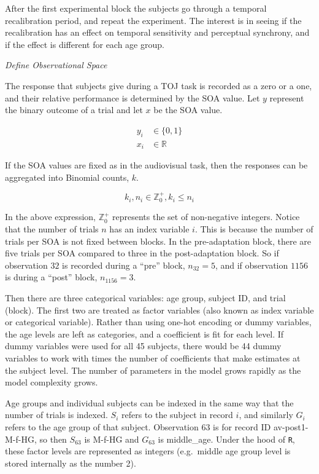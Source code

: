 \documentclass[11pt, oneside, openany]{scrbook}
\begin{document}
After the first experimental block the subjects go through a temporal recalibration period, and repeat the experiment. The interest is in seeing if the recalibration has an effect on temporal sensitivity and perceptual synchrony, and if the effect is different for each age group.

\emph{Define Observational Space}

The response that subjects give during a TOJ task is recorded as a zero or a one, and their relative performance is determined by the SOA value. Let \(y\) represent the binary outcome of a trial and let \(x\) be the SOA value.


\begin{align*}
y_i &\in \lbrace 0, 1\rbrace \\
x_i &\in \mathbb{R}
\end{align*}

If the SOA values are fixed as in the audiovisual task, then the responses can be aggregated into Binomial counts, \(k\).

\[k_i, n_i \in \mathbb{Z}_0^+, k_i \le n_i\]

In the above expression, \(\mathbb{Z}_0^+\) represents the set of non-negative integers. Notice that the number of trials \(n\) has an index variable \(i\). This is because the number of trials per SOA is not fixed between blocks. In the pre-adaptation block, there are five trials per SOA compared to three in the post-adaptation block. So if observation \(32\) is recorded during a ``pre'' block, \(n_{32} = 5\), and if observation \(1156\) is during a ``post'' block, \(n_{1156} = 3\).

Then there are three categorical variables: age group, subject ID, and trial (block). The first two are treated as factor variables (also known as index variable or categorical variable). Rather than using one-hot encoding or dummy variables, the age levels are left as categories, and a coefficient is fit for each level. If dummy variables were used for all 45 subjects, there would be 44 dummy variables to work with times the number of coefficients that make estimates at the subject level. The number of parameters in the model grows rapidly as the model complexity grows.

Age groups and individual subjects can be indexed in the same way that the number of trials is indexed. \(S_i\) refers to the subject in record \(i\), and similarly \(G_i\) refers to the age group of that subject. Observation \(63\) is for record ID av-post1-M-f-HG, so then \(S_{63}\) is M-f-HG and \(G_{63}\) is middle\_age. Under the hood of \texttt{R}, these factor levels are represented as integers (e.g.~middle age group level is stored internally as the number 2).
\end{document}
